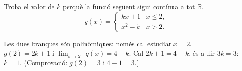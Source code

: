 \begin{apartats}
\begin{nomesllarg}
Troba el valor de $k$ perquè la funció següent sigui contínua a tot $\mathbb{R}$.
\[
g(x)=\begin{cases}
  kx+1  & \si{x\le 2},\\[3pt]
  x^2-k & \si{x>2}.
\end{cases}
\]

\begin{solucio}
Les dues branques són polinòmiques: només cal estudiar $x=2$.\\
$g(2)=2k+1$ i $\lim_{x\to2^+}g(x)=4-k$. Cal $2k+1=4-k$, és a dir $3k=3$: $\boxed{k=1}$.
(Comprovació: $g(2)=3$ i $4-1=3$.)
\end{solucio}
\end{nomesllarg}

\end{apartats}

